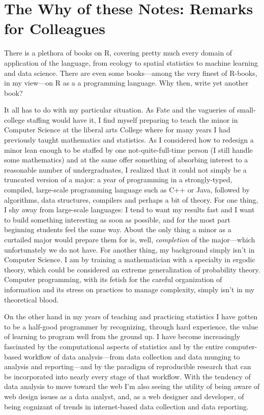 \documentclass[]{book}
\theoremstyle{definition}
\theoremstyle{definition}
\theoremstyle{definition}
\theoremstyle{remark}
\begin{document}
\section{The Why of these Notes: Remarks for
Colleagues}\label{the-why-of-these-notes-remarks-for-colleagues}

There is a plethora of books on R, covering pretty much every domain of
application of the language, from ecology to spatial statistics to
machine learning and data science. There are even some books---among the
very finest of R-books, in my view---on R as a a programming language.
Why then, write yet another book?

It all has to do with my particular situation. As Fate and the vagueries
of small-college staffing would have it, I find myself preparing to
teach the minor in Computer Science at the liberal arts College where
for many years I had previously taught mathematics and statistics. As I
considered how to redesign a minor lean enough to be staffed by one
not-quite-full-time person (I still handle some mathematics) and at the
same offer something of absorbing interest to a reasonable number of
undergraduates, I realized that it could not simply be a truncated
version of a major: a year of programming in a strongly-typed, compiled,
large-scale programming language such as C++ or Java, followed by
algorithms, data structures, compilers and perhaps a bit of theory. For
one thing, I shy away from large-scale languages: I tend to want my
results fast and I want to build something interesting as soon as
possible, and for the most part beginning students feel the same way.
About the only thing a minor as a curtailed major would prepare them for
is, well, \emph{completion} of the major---which unfortunately we do not
have. For another thing, my background simply isn't in Computer Science.
I am by training a mathematician with a specialty in ergodic theory,
which could be considered an extreme generalization of probability
theory. Computer programming, with its fetish for the careful
organization of information and its stress on practices to manage
complexity, simply isn't in my theoretical blood.

On the other hand in my years of teaching and practicing statistics I
have gotten to be a half-good programmer by recognizing, through hard
experience, the value of learning to program well from the ground up. I
have become increasingly fascinated by the computational aspects of
statistics and by the entire computer-based workflow of data
analysis---from data collection and data munging to analysis and
reporting---and by the paradigm of reproducible research that can be
incorporated into nearly every stage of that workflow. With the tendency
of data analysis to move toward the web I'm also seeing the utility of
being aware of web design issues as a data analyst, and, as a web
designer and developer, of being cognizant of trends in internet-based
data collection and data reporting.
\end{document}
